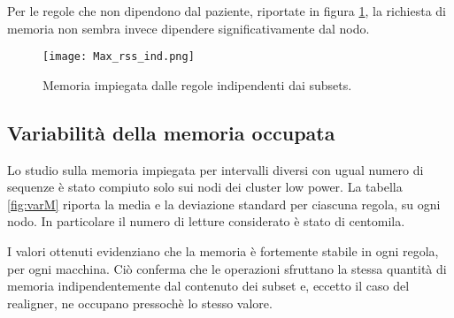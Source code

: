 Per le regole che non dipendono dal paziente, riportate in figura \ref{fig:RSSind}, la richiesta di memoria non sembra invece dipendere significativamente dal nodo.

\begin{figure}[H]
\centering
\texttt{[image: Max\_rss\_ind.png]}
\caption{Memoria impiegata dalle regole indipendenti dai subsets.}
\label{fig:RSSind}
\end{figure}

\subsection{Variabilità della memoria occupata}
Lo studio sulla memoria impiegata per intervalli diversi con ugual numero di sequenze è stato compiuto solo sui nodi dei cluster low power. 
La tabella \ref{fig:varM} riporta la media e la deviazione standard per ciascuna regola, su ogni nodo.
In particolare il numero di letture considerato è stato di centomila.

\begin{table}[H]
\centering
{}
\caption{Media e deviazione standard, espresse in MB, della memoria occupata dalle regole su diversi subset da centomila letture.}
\label{fig:varM}
\end{table}

I valori ottenuti evidenziano che la memoria è fortemente stabile in ogni regola, per ogni macchina.
Ciò conferma che le operazioni sfruttano la stessa quantità di memoria indipendentemente dal contenuto dei subset e, eccetto il caso del realigner, ne occupano pressochè lo stesso valore. 


